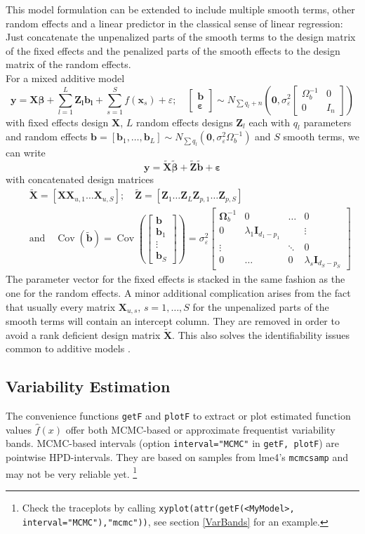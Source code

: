 \documentclass[12pt]{article}
\newcommand{\code}[1]{\texttt{\small{#1}}}
\newcommand{\package}[1]{\textsf{\small{#1}}}
\newcommand{\bvec}{\left[\begin{array}{c}}
\newcommand{\evec}{\end{array}\right]}
\newcommand{\bmat}[1]{\left[\begin{array}{*{#1}{c}}}
\newcommand{\emat}{\end{array}\right]}
\newcommand{\eps}{\varepsilon}
\newcommand{\sigmaeps} {\sigma^2_{\eps}}
\newcommand{\Cov}{\operatorname{Cov}}
\begin{document}
This model formulation can be extended to include
multiple smooth terms, other random effects and a linear predictor
in the classical sense of linear regression: 
Just concatenate the unpenalized parts of
the smooth terms to the design matrix of the fixed effects and the
penalized parts of the smooth effects to the design matrix of the
random effects.\\
For a mixed additive model
\[
\bm y= \bm{X\beta} + \sum^L_{l=1}\bm{Z_l b_l} +\sum_{s=1}^S f(\bm x_s)+\eps;\quad \bvec \bm b \\
\bm \eps \evec \sim N_{\sum q_l + n}\left(\bm 0,\sigmaeps \bmat{2} \Omega_b^{-1} & 0 \\
0 & I_n \emat \right)
\]
with fixed effects design $\bm X$, $L$ random effects designs $\bm Z_l$ each with
$q_l$ parameters and random effects 
$\bm b=[\bm b_1,\dots,\bm  b_L] \sim N_{\sum q_l}(\bm 0, \sigmaeps\Omega_b^{-1})$
and $S$ smooth terms, we can write
\[
\bm y= \bm {\tilde X \tilde \beta + \tilde Z \tilde b + \eps}
\]
with concatenated design matrices
\begin{eqnarray*}
&& \bm{\tilde X}=\left[ \bm{X} \bm{X}_{u,1} \hdots \bm{X}_{u,S}\right];\quad
 \bm{\tilde Z}=\left[ \bm{Z}_1 \hdots \bm{Z}_L \bm{Z}_{p,1} \hdots \bm{Z}_{p,S} \right] \\
&&
\text{and} \quad \Cov(\bm{\tilde b})= \Cov \left( \bvec \bm b \\ \bm b_1 \\ \vdots \\
\bm b_S \evec \right) =
\sigmaeps \bmat{4} \bm \Omega_b^{-1}& 0 & \hdots & 0 \\ 0&\lambda_1 \bm I_{d_1-p_1}&  &\vdots \\
                  \vdots &  &\ddots&0\\0&\hdots&0&\lambda_s \bm I_{d_S-p_S} \emat
\end{eqnarray*}
The parameter vector for the fixed effects is stacked in the same fashion as the
one for the random effects. A minor additional complication arises from the fact
that usually every matrix $\bm X_{u,s},\,s=1,\dots,S$ for the unpenalized parts
of the smooth terms will contain an intercept column. They are removed in order
to avoid a rank deficient design matrix $\bm{\tilde X}$. This also solves the
identifiability issues common to additive models \cite[ch. 3.3]{Wood:2006}.

\subsection{Variability Estimation}\label{VarEst} 
The convenience functions \code{getF} and \code{plotF} to extract or plot
estimated function values $\hat f(x)$ offer both MCMC-based or approximate
frequentist variability bands. MCMC-based intervals (option
\code{interval="MCMC"} in \code{getF, plotF}) are pointwise HPD-intervals. They
are based on samples from \package{lme4}'s \code{mcmcsamp} and may not be very
reliable yet. \footnote{ Check the traceplots by calling
\code{xyplot(attr(getF(<MyModel>, interval="MCMC"),"mcmc"))}, see section
\ref{VarBands} for an example.}
\end{document}
